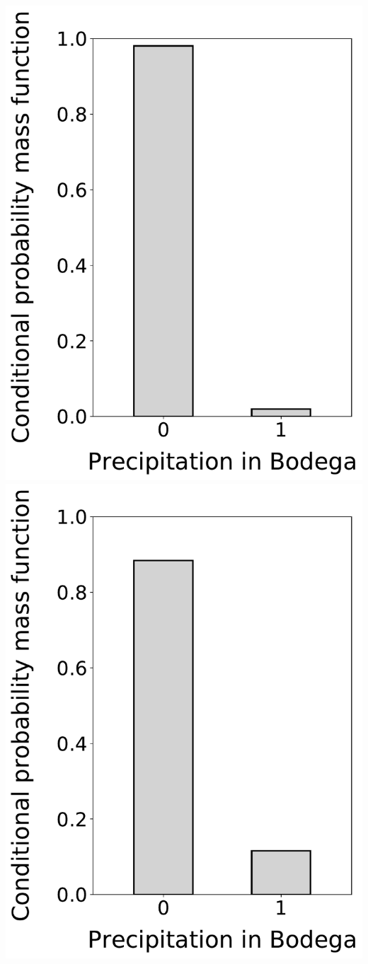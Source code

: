 \documentclass[12pt,twoside]{article}
\begin{document}
\begin{enumerate}
\includegraphics[scale=.5]{precipitation_cond_pmf_1_given_3eq0.pdf}
\includegraphics[scale=.5]{precipitation_cond_pmf_1_given_3eq1.pdf}

\end{enumerate}
\end{document}
